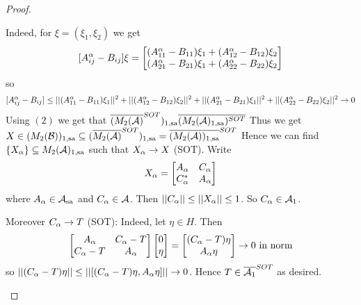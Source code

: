 \documentclass[10pt,english,a4paper]{article}
\theoremstyle{definition}
\def\sa{\text{sa}}
\begin{document}
\begin{proof}
\begin{enumerate}[(1)]
Indeed, for $\xi = (\xi_1,\xi_2)$ we get 
\[ [A_{ij}^{\alpha} - B_{ij}]\xi = \begin{bmatrix}(A_{11}^{\alpha} - B_{11})\xi_1 + (A_{12}^{\alpha}-B_{12}
)\xi_2 \\  (A_{21}^{\alpha} - B_{21})\xi_1 + (A_{22}^{\alpha}-B_{22}
)\xi_2  \end{bmatrix} \]
so 
\[ [A_{ij}^{\alpha}- B_{ij}] \leq ||(A_{11}^{\alpha}-B_{11})\xi_1||^2 + 
||(A_{12}^{\alpha}-B_{12})\xi_2||^2
+ ||(A_{21}^{\alpha}-B_{21})\xi_1||^2
+ ||(A_{22}^{\alpha}-B_{22})\xi_2||^2 \to 0
\]
Using $(2)$ we get that $\ol{(M_{2}(\As)}^{SOT})_{1,\sa}
\ol{(M_2(\As)_{1,\sa})^{SOT}}$
Thus we get $X \in (M_2(\Bs))_{1,\sa}\subseteq (\ol{M_2(\As)}^{SOT})_{1,\sa}
= \ol{(M_2(\As))_{1,\sa}}^{SOT}$
Hence we can find $\{X_{\al}\} \subseteq M_2(\As)_{1,\sa}$ such that 
$X_{\alpha}\to X$ (SOT).
Write 
\[ X_{\alpha} = \begin{bmatrix} A_{\alpha} & C_{\alpha} \\ C_{\alpha}^{*} &A_{\alpha} \end{bmatrix} \]
where $A_{\al} \in \As_{\sa}$ and $C_{\alpha} \in \mathcal{A}$. 
Then $||C_{\alpha}|| \leq ||X_{\alpha}|| \leq 1$. So $C_{\alpha}\in \mathcal{A}_{1}$.

Moreover $C_{\alpha}\to T$ (SOT):
Indeed, let $\eta\in H$.
Then 
\[ \begin{bmatrix} A_{\alpha} & C_{\alpha} -T \\ C_{\alpha}-T & A_{\alpha} \end{bmatrix} 
\begin{bmatrix} 0 \\ \eta \end{bmatrix}
= \begin{bmatrix} (C_{\alpha}-T)\eta \\ A_{\alpha}\eta \end{bmatrix}
\to 0 \text{ in norm}\]
so $||(C_{\alpha}-T)\eta|| \leq ||[(C_{\alpha}-T)\eta, A_{\alpha}\eta ]|| \to 0$.
Hence $T \in \overline{\mathcal{A}_1}^{SOT}$ as desired. 

\end{enumerate}

\end{proof}
\end{document}
